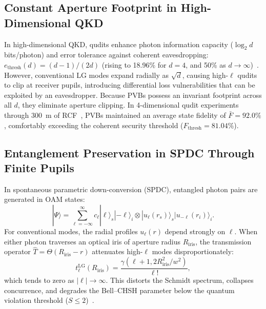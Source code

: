 \documentclass[11pt,a4paper]{article}
\begin{document}
\subsection{Constant Aperture Footprint in High-Dimensional QKD}

In high-dimensional QKD, qudits enhance photon information capacity ($\log_2 d$ bits/photon) and error tolerance against coherent eavesdropping: $e_{\text{thresh}}(d) = (d-1)/(2d)$ (rising to 18.96\% for $d=4$, and 50\% as $d \to \infty$)~\cite{Cerf2002,Mirhosseini2015,BennettBrassard1984}. However, conventional LG modes expand radially as $\sqrt{d}$, causing high-$\ell$ qudits to clip at receiver pupils, introducing differential loss vulnerabilities that can be exploited by an eavesdropper. Because PVBs possess an invariant footprint across all $d$, they eliminate aperture clipping. In 4-dimensional qudit experiments through 300~m of RCF~\cite{Villalba2023}, PVBs maintained an average state fidelity of $\bar{F} = 92.0\%$, comfortably exceeding the coherent security threshold ($F_{\text{thresh}} = 81.04\%$).

\subsection{Entanglement Preservation in SPDC Through Finite Pupils}

In spontaneous parametric down-conversion (SPDC), entangled photon pairs are generated in OAM states:
\begin{equation}
|\Psi\rangle = \sum_{\ell=-\infty}^\infty c_\ell |\ell\rangle_s |-\ell\rangle_i \otimes |u_\ell(r_s)\rangle_s |u_{-\ell}(r_i)\rangle_i.
\label{eq:spdc_biphoton_state}
\end{equation}
For conventional modes, the radial profiles $u_\ell(r)$ depend strongly on $\ell$. When either photon traverses an optical iris of aperture radius $R_{\text{iris}}$, the transmission operator $\hat{T} = \Theta(R_{\text{iris}} - r)$ attenuates high-$\ell$ modes disproportionately:
\begin{equation}
t_\ell^{\text{LG}}(R_{\text{iris}}) = \frac{\gamma(\ell+1, 2 R_{\text{iris}}^2 / w^2)}{{\ell}!},
\label{eq:lg_pupil_attenuation}
\end{equation}
which tends to zero as $|\ell| \to \infty$. This distorts the Schmidt spectrum, collapses concurrence, and degrades the Bell--CHSH parameter below the quantum violation threshold ($S \le 2$)~\cite{Clauser1969,LawEberly2004,Walborn2010,Sakurai2020}.
\end{document}
